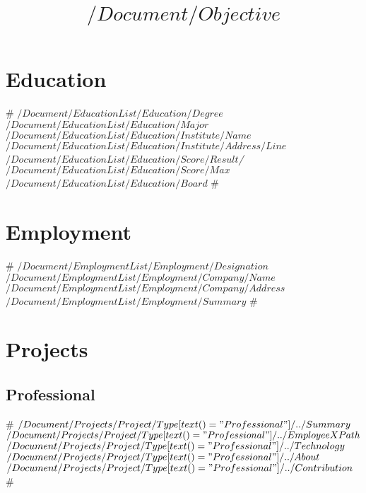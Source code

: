 \documentclass[11pt,a4paper,sans]{moderncv}   %
\title{$/Document/Objective$}               %
\begin{document}
\makecvtitle

\section{Education}

#
{$/Document/EducationList/Education/Degree$ $/Document/EducationList/Education/Major$ }
{$/Document/EducationList/Education/Institute/Name$}
{$/Document/EducationList/Education/Institute/Address/Line$}
{\textit{$/Document/EducationList/Education/Score/Result$/$/Document/EducationList/Education/Score/Max$}}
{$/Document/EducationList/Education/Board$}  %
#


\section{Employment}
#
{$/Document/EmploymentList/Employment/Designation$}
{$/Document/EmploymentList/Employment/Company/Name$}
{$/Document/EmploymentList/Employment/Company/Address$}
{}
{$/Document/EmploymentList/Employment/Summary$}
#

\section{Projects}
\subsection{Professional}
#
{$/Document/Projects/Project/Type[text()="Professional"]/../Summary$}
{$/Document/Projects/Project/Type[text()="Professional"]/../EmployeeXPath$}
{$/Document/Projects/Project/Type[text()="Professional"]/../Technology$}{}
{$/Document/Projects/Project/Type[text()="Professional"]/../About$\newline{}
$/Document/Projects/Project/Type[text()="Professional"]/../Contribution$}
#
\end{document}
